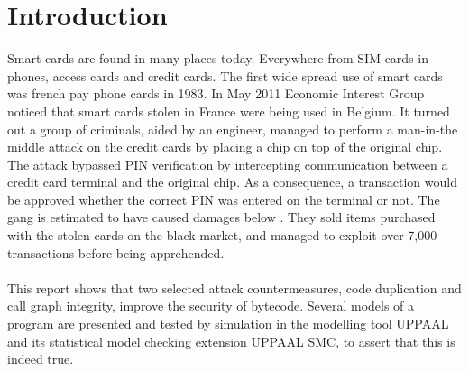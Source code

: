 \chapter{Introduction}
Smart cards are found in many places today. Everywhere from SIM cards in phones, access cards and credit cards. The first wide spread use of smart cards was french pay phone cards in 1983\cite[p. 366]{modbank}. In May 2011 Economic Interest Group noticed that smart cards stolen in France were being used in Belgium\cite{fun}. It turned out a group of criminals, aided by an engineer, managed to perform a man-in-the middle attack on the credit cards by placing a chip on top of the original chip. The attack bypassed PIN verification by intercepting communication between a credit card terminal and the original chip. As a consequence, a transaction would be approved whether the correct PIN was entered on the terminal or not. The gang is estimated to have caused damages below . They sold items purchased with the stolen cards on the black market, and managed to exploit over 7,000 transactions before being apprehended.\\\\
This report shows that two selected attack countermeasures, code duplication and call graph integrity, improve the security of \jc bytecode. Several models of a program are presented and tested by simulation in the modelling tool UPPAAL\cite{uppaal_site} and its statistical model checking extension UPPAAL SMC\cite{uppaal_smc_site}, to assert that this is indeed true.
